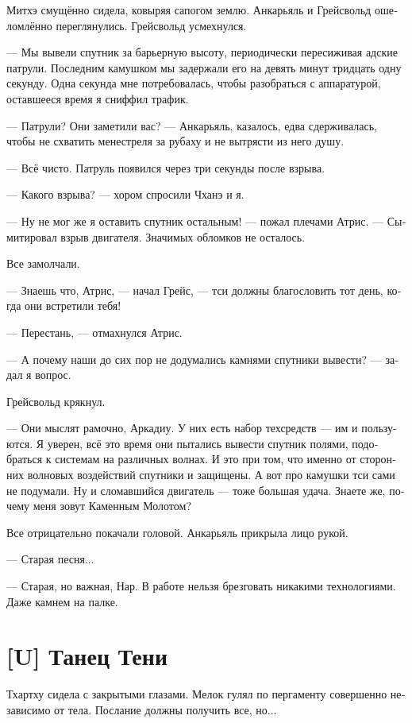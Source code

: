 \documentclass[a4paper,12pt,fleqn]{book}\usepackage{polyglossia}\setdefaultlanguage[babelshorthands=true]{russian}\setotherlanguage{english}\defaultfontfeatures{Ligatures=TeX,Mapping=tex-text}\usepackage{xcolor}\newcommand{\ml}[3]{#2}
\newcommand{\textspace}{\vspace{1em}{\centering\Large\bfseries<...>\par}\vspace{1em}}
\begin{document}
Митхэ смущённо сидела, ковыряя сапогом землю.
Анкарьяль и Грейсвольд ошеломлённо переглянулись.
Грейсвольд усмехнулся.

--- Мы вывели спутник за барьерную высоту, периодически пересиживая адские патрули.
Последним камушком мы задержали его на девять минут тридцать одну секунду.
Одна секунда мне потребовалась, чтобы разобраться с аппаратурой, оставшееся время я сниффил трафик.

--- Патрули?
Они заметили вас? --- Анкарьяль, казалось, едва сдерживалась, чтобы не схватить менестреля за рубаху и не вытрясти из него душу.

--- Всё чисто.
Патруль появился через три секунды после взрыва.

--- Какого взрыва? --- хором спросили Чханэ и я.

--- Ну не мог же я оставить спутник остальным! --- пожал плечами Атрис.
--- Сымитировал взрыв двигателя.
Значимых обломков не осталось.

Все замолчали.

--- Знаешь что, Атрис, --- начал Грейс, --- тси должны благословить тот день, когда они встретили тебя!

--- Перестань, --- отмахнулся Атрис.

--- А почему наши до сих пор не додумались камнями спутники вывести? --- задал я вопрос.

Грейсвольд крякнул.

--- Они мыслят рамочно, Аркадиу.
У них есть набор техсредств --- им и пользуются.
Я уверен, всё это время они пытались вывести спутник полями, подобраться к системам на различных волнах.
И это при том, что именно от сторонних волновых воздействий спутники и защищены.
А вот про камушки тси сами не подумали.
Ну и сломавшийся двигатель --- тоже большая удача.
Знаете же, почему меня зовут Каменным Молотом?

Все отрицательно покачали головой.
Анкарьяль прикрыла лицо рукой.

--- Старая песня...

--- Старая, но важная, Нар.
В работе нельзя брезговать никакими технологиями.
Даже камнем на палке.

\section{[U] Танец Тени}

\textspace

Тхартху сидела с закрытыми глазами.
Мелок гулял по пергаменту совершенно независимо от тела.
Послание должны получить все, но...
\end{document}
